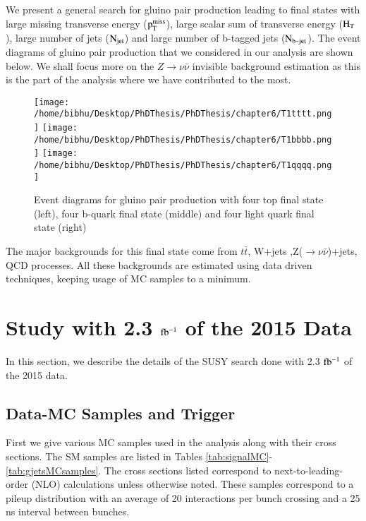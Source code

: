 We present a general search for gluino pair production leading to final states with large missing transverse energy ($\rm p_{T}^{miss}$), large scalar sum of transverse energy ($\rm H_{T}$), large number of jets ($\rm N_{jet}$) and large number of b-tagged jets ($\rm N_{b\texttt{-}jet}$). The event diagrams of gluino pair production that we considered in our analysis are shown below. We shall focus more on the $Z\rightarrow \nu \bar{\nu} $ invisible background estimation as this is the part of the analysis where we have contributed to the most. 


\begin{figure}[H]
    \centering
    \texttt{[image: /home/bibhu/Desktop/PhDThesis/PhDThesis/chapter6/T1tttt.png]}
    \texttt{[image: /home/bibhu/Desktop/PhDThesis/PhDThesis/chapter6/T1bbbb.png]}
    \texttt{[image: /home/bibhu/Desktop/PhDThesis/PhDThesis/chapter6/T1qqqq.png]}
    \caption{ \small Event diagrams for gluino pair production with four top final state (left), four b-quark final state (middle) and four light quark final state (right)}
    \label{fig:SMSSUSYeventDiagrams}
\end{figure}


The major backgrounds for this final state come from $t\bar{t}$, W+jets ,Z($\rightarrow \nu\bar{\nu}$)+jets, QCD processes. All these backgrounds are estimated using data driven techniques, keeping usage of MC samples to a minimum. 

\section{Study with 2.3 $\rm fb^{-1}$ of the 2015 Data}

In this section, we describe the details of the SUSY search done with 2.3 $\rm fb^{-1}$ of the 2015 data.

\subsection{Data-MC Samples and Trigger}

First we give various MC samples  used in the analysis  along with their cross sections. 
The SM samples are listed in Tables \ref{tab:signalMC}-\ref{tab:gjetsMCsamples}.  The cross
sections listed correspond to next-to-leading-order (NLO) calculations 
unless otherwise noted.  These samples correspond to a
pileup distribution with an average of 20 interactions per
bunch crossing and a 25 ns interval between bunches.

